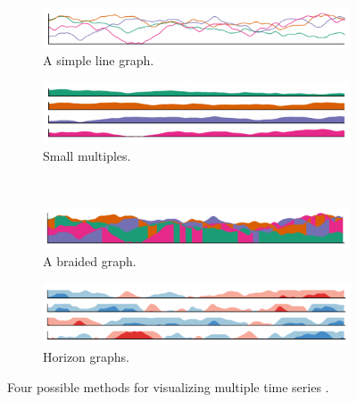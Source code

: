 \documentclass{article}
\begin{document}
\begin{figure}
        \centering
        \begin{subfigure}[b]{0.4\textwidth}
                \includegraphics[width=\textwidth]{figures/ts_simplelinegraph.png}
                \caption{A simple line graph.}
                \label{fig:ts_simple}
        \end{subfigure}
        \begin{subfigure}[b]{0.4\textwidth}
                \includegraphics[width=\textwidth]{figures/ts_smallmultiples.png}
                \caption{Small multiples.}
                \label{fig:ts_smmult}
        \end{subfigure}
        \\
        \begin{subfigure}[b]{0.4\textwidth}
                \includegraphics[width=\textwidth]{figures/ts_braidedgraph.png}
                \caption{A braided graph.}
                \label{fig:ts_braid}
        \end{subfigure}
        \begin{subfigure}[b]{0.4\textwidth}
                \includegraphics[width=\textwidth]{figures/ts_horizongraphs.png}
                \caption{Horizon graphs.}
                \label{fig:ts_horizon}
        \end{subfigure}
        \caption{Four possible methods for visualizing multiple time series \cite{javed2010}.}
        \label{fig:ts_compare}
\end{figure}
\end{document}
